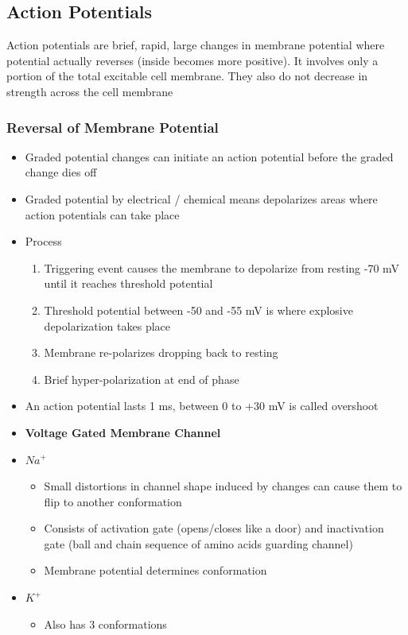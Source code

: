 \documentclass[11pt]{article}
\begin{document}
\subsection{Action Potentials}
Action potentials are brief, rapid, large changes in membrane potential where potential actually reverses (inside becomes more positive). It involves only a portion of the total excitable cell membrane. They also do not decrease in strength across the cell membrane
\subsubsection{Reversal of Membrane Potential}
\begin{itemize}
\item Graded potential changes can initiate an action potential before the graded change dies off
\item Graded potential by electrical / chemical means depolarizes areas where action potentials can take place 
\item Process
\begin{enumerate}
\item Triggering event causes the membrane to depolarize from resting -70 mV until it reaches threshold potential 
\item Threshold potential between -50 and -55 mV is where explosive depolarization takes place
\item Membrane re-polarizes dropping back to resting
\item Brief hyper-polarization at end of phase
\end{enumerate}
\item An action potential lasts 1 ms, between 0 to +30 mV is called overshoot
\item \textbf{Voltage Gated Membrane Channel}
\item $Na^+$
\begin{itemize}
\item Small distortions in channel shape induced by changes can cause them to flip to another conformation
\item Consists of activation gate (opens/closes like a door) and inactivation gate (ball and chain sequence of amino acids guarding channel)
\item Membrane potential determines conformation
\end{itemize}
\item $K^+$
\begin{itemize}
\item Also has 3 conformations 

\end{itemize}
\end{itemize}
\end{document}
